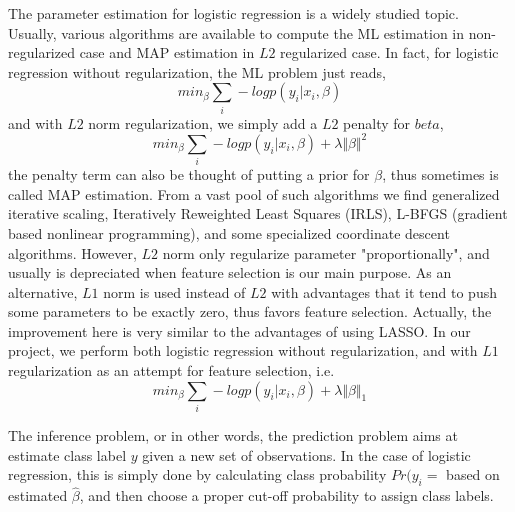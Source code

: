 The parameter estimation for logistic regression is a widely studied topic. Usually, various algorithms are available to compute the ML estimation in non-regularized case and MAP estimation in $L2$ regularized case. In fact, for logistic regression without regularization, the ML problem just reads,
\begin{equation}
min_{\beta} \sum_i -logp(y_i|x_i,\beta)
\end{equation}
and with $L2$ norm regularization, we simply add a $L2$ penalty for $beta$,
\begin{equation}\nonumber
min_{\beta} \sum_i -logp(y_i|x_i,\beta) + \lambda \Vert \beta \Vert^2
\end{equation}
the penalty term can also be thought of putting a prior for $\beta$, thus sometimes is called MAP estimation. From a vast pool of such algorithms we find  generalized iterative scaling, Iteratively Reweighted Least Squares (IRLS), L-BFGS (gradient based nonlinear programming), and some specialized coordinate descent algorithms. However, $L2$ norm only regularize parameter "proportionally", and usually is depreciated when feature selection is our main purpose. As an alternative, $L1$ norm is used instead of $L2$ with advantages that it tend to push some parameters to be exactly zero, thus favors feature selection. Actually, the improvement here is very similar to the advantages of using LASSO. In our project, we perform both logistic regression without regularization, and with $L1$ regularization as an attempt for feature selection, i.e.
\begin{equation}\nonumber
min_{\beta} \sum_i -logp(y_i|x_i,\beta) + \lambda \Vert \beta \Vert_1
\end{equation}

The inference problem, or in other words, the prediction problem aims at estimate class label $y$ given a new set of observations. In the case of logistic regression, this is simply done by calculating class probability $Pr(y_i=$ based on estimated $\hat{\beta}$, and then choose a proper cut-off probability to assign class labels. 

